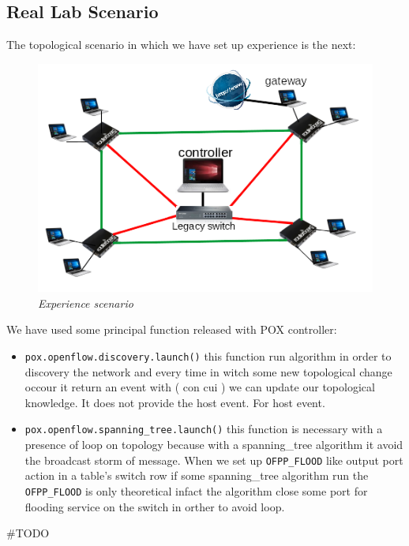 \documentclass[conference,10pt]{IEEEtran}
\begin{document}
\subsection{Real Lab Scenario}
The topological scenario in which we have set up experience is the next:
\begin{figure}[!h]
 \centering
 \includegraphics[scale=0.70]{images/topo.png}
 \caption{\emph{Experience scenario}}
 \label{fig:topo}
\end{figure}

We have used some principal function released with POX controller:
\begin{itemize}
 \item \texttt{pox.openflow.discovery.launch()} this function run algorithm in order to discovery the network and every time in witch some new 
 topological change occour it return an event with ( con cui ) we can update our topological knowledge.
 It does not provide the host event. For host event\cite{pox}.
 \item \texttt{pox.openflow.spanning_tree.launch()} this function is necessary with a presence of loop on topology 
 because with a spanning_tree algorithm it avoid the broadcast storm of message. When we set up \texttt{OFPP_FLOOD} like output port action in a table's 
 switch row if some spanning_tree algorithm run the \texttt{OFPP_FLOOD} is only theoretical infact the algorithm close some port for flooding service 
 on the switch in orther to avoid loop\cite{pox}.
\end{itemize}

\#TODO %
\end{document}
